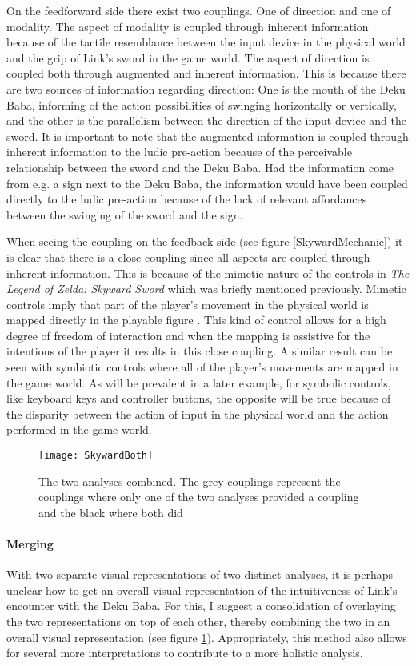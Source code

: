 On the feedforward side there exist two couplings. One of direction and one of modality. The aspect of modality is coupled through inherent information because of the tactile resemblance between the input device in the physical world and the grip of Link's sword in the game world. The aspect of direction is coupled both through augmented and inherent information. This is because there are two sources of information regarding direction: One is the mouth of the Deku Baba, informing of the action possibilities of swinging horizontally or vertically, and the other is the parallelism between the direction of the input device and the sword. It is important to note that the augmented information is coupled through inherent information to the ludic pre-action because of the perceivable relationship between the sword and the Deku Baba. Had the information come from e.g. a sign next to the Deku Baba, the information would have been coupled directly to the ludic pre-action because of the lack of relevant affordances between the swinging of the sword and the sign.

When seeing the coupling on the feedback side (see figure \ref{SkywardMechanic}) it is clear that there is a close coupling since all aspects are coupled through inherent information. This is because of the mimetic nature of the controls in \textit{The Legend of Zelda: Skyward Sword} which was briefly mentioned previously. Mimetic controls imply that part of the player's movement in the physical world is mapped directly in the playable figure \cite{calleja}. This kind of control allows for a high degree of freedom of interaction and when the mapping is assistive for the intentions of the player it results in this close coupling. A similar result can be seen with symbiotic controls where all of the player's movements are mapped in the game world. As will be prevalent in a later example, for symbolic controls, like keyboard keys and controller buttons, the opposite will be true because of the disparity between the action of input in the physical world and the action performed in the game world.

\begin{figure}[h]
  \texttt{[image: SkywardBoth]}
  \caption{The two analyses combined. The grey couplings represent the couplings where only one of the two analyses provided a coupling and the black where both did}
  \label{SkywardBoth}
\end{figure}

\paragraph{Merging}
With two separate visual representations of two distinct analyses, it is perhaps unclear how to get an overall visual representation of the intuitiveness of Link's encounter with the Deku Baba. For this, I suggest a consolidation of overlaying the two representations on top of each other, thereby combining the two in an overall visual representation (see figure \ref{SkywardBoth}). Appropriately, this method also allows for several more interpretations to contribute to a more holistic analysis.

